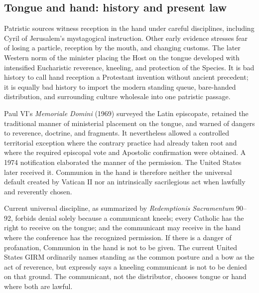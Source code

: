 \subsection{Tongue and hand: history and present law}

Patristic sources witness reception in the hand under careful disciplines, including Cyril of Jerusalem's mystagogical instruction. Other early evidence stresses fear of losing a particle, reception by the mouth, and changing customs. The later Western norm of the minister placing the Host on the tongue developed with intensified Eucharistic reverence, kneeling, and protection of the Species. It is bad history to call hand reception a Protestant invention without ancient precedent; it is equally bad history to import the modern standing queue, bare-handed distribution, and surrounding culture wholesale into one patristic passage.

Paul VI's \emph{Memoriale Domini} (1969) surveyed the Latin episcopate, retained the traditional manner of ministerial placement on the tongue, and warned of dangers to reverence, doctrine, and fragments. It nevertheless allowed a controlled territorial exception where the contrary practice had already taken root and where the required episcopal vote and Apostolic confirmation were obtained. A 1974 notification elaborated the manner of the permission. The United States later received it. Communion in the hand is therefore neither the universal default created by Vatican II nor an intrinsically sacrilegious act when lawfully and reverently chosen.

Current universal discipline, as summarized by \emph{Redemptionis Sacramentum} 90--92, forbids denial solely because a communicant kneels; every Catholic has the right to receive on the tongue; and the communicant may receive in the hand where the conference has the recognized permission. If there is a danger of profanation, Communion in the hand is not to be given. The current United States GIRM ordinarily names standing as the common posture and a bow as the act of reverence, but expressly says a kneeling communicant is not to be denied on that ground. The communicant, not the distributor, chooses tongue or hand where both are lawful.

